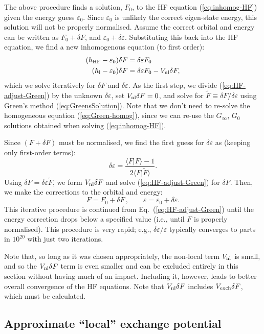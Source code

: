 \documentclass[10pt,twocolumn,a4paper]{article}%
\newcommand{\braket}[1]{\ensuremath{\langle #1\rangle}}	%
\newcommand{\be}{\begin{equation}}
\newcommand{\ee}{\end{equation}}
\def\en{\ensuremath{\varepsilon}}
\begin{document}
The above procedure finds a solution, $F_0$, to the HF equation (\ref{eq:inhomog-HF}) given the energy guess $\en_0$.
Since $\en_0$ is unlikely the correct eigen-state energy, this solution will not be properly normalised.
Assume the correct orbital and energy can be written as
$F_0 +  \delta F$, and
$\en_0 + \delta\en $.
Substituting this back into the HF equation, we find a new inhomogenous equation (to first order):
\begin{align}
(h_{\rm HF} - \en_0) \delta F &=  \delta\en F_0  \\
(h_{\rm l} - \en_0) \delta F &=  \delta\en F_0  - V_{\rm nl} \delta F,  \label{eq:HF-adjust-Green}
\end{align}
which we solve iteratively for $\delta F$ and $\delta \en$.
As the first step, we divide (\ref{eq:HF-adjust-Green}) by the unknown $\delta\en$, set $V_{\rm nl} \delta F=0$, and solve for $\tilde F\equiv\delta F/\delta\en$ using Green's method (\ref{eq:GreensSolution}).
Note that we don't need to re-solve the homogeneous equation (\ref{eq:Green-homog}), since we can re-use the $G_\infty$, $G_0$
solutions obtained when solving (\ref{eq:inhomog-HF}).

Since $(F+\delta F)$ must be normalised, we find the first guess for $\delta \en$ as (keeping only first-order terms):
\be
\delta \en = \frac{\braket{F|F} - 1}{2\braket{F|\tilde F}}.
\ee
Using  $\delta F = \delta\en\tilde F$, we form $V_{\rm nl} \delta F$ and solve (\ref{eq:HF-adjust-Green}) for $\delta F$.
Then, we make the corrections to the orbital and energy:
\be
F= F_0+\delta F \, , \qquad \en=\en_0 + \delta\en.
\ee
This iterative procedure is continued from Eq.~(\ref{eq:HF-adjust-Green}) until the energy correction drops below a specified value
(i.e., until $F$ is properly normalised).
This procedure is very rapid; e.g., $\delta\en/\en$ typically converges to parts in $10^{20}$ with just two iterations.

Note that, so long as it was chosen appropriately, the non-local term $V_{\rm nl}$ is small, and so the $V_{\rm nl}\delta F$ term is even smaller and can be excluded entirely in this section without having much of an impact.
Including it, however, leads to better overall convergence of the HF equations.
Note that $V_{\rm nl} \delta F$ includes $V_{\rm exch} \delta F$, which must be calculated.




\subsection{Approximate ``local'' exchange potential}\label{sec:hf-approx}
\end{document}
